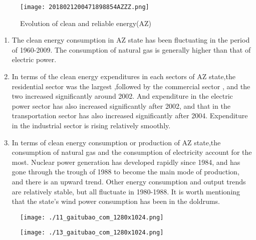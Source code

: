 \documentclass[a4paper]{article}
\begin{document}
\begin{figure}[H]
	\begin{center}
		\texttt{[image: 2018021200471898854AZZZ.png]}
		\caption{Evolution of clean and reliable energy(AZ)}
		\label{Fig:1}
	\end{center}
	\vspace{-0.5em}
\end{figure}

\begin{enumerate}
\item The clean energy consumption in AZ state has been fluctuating in the period of 1960-2009. The consumption of natural gas is generally higher than that of electric power.

\item In terms of the clean energy expenditures in each sectors of AZ state,the residential sector was the largest ,followed by the commercial sector , and the two increased significantly around 2002. And expenditure in the electric power sector has also increased significantly after 2002, and that in the transportation sector has also increased significantly after 2004. Expenditure in the industrial sector is rising relatively smoothly.

\item In terms of clean energy consumption or production of AZ state,the consumption of natural gas and the consumption of electricity account for the most. Nuclear power generation has developed rapidly since 1984, and has gone through the trough of 1988 to become the main mode of production, and there is an upward trend. Other energy consumption and output trends are relatively stable, but all fluctuate in 1980-1988. It is worth mentioning that the state's wind power consumption has been in the doldrums.

\end{enumerate}



\begin{figure}[H]
\begin{minipage}[t]{0.5\linewidth}
\centering
\texttt{[image: ./11\_gaitubao\_com\_1280x1024.png]}
\label{fig:side:a}
\end{minipage}%
\begin{minipage}[t]{0.5\linewidth}
\centering
\texttt{[image: ./13\_gaitubao\_com\_1280x1024.png]}
\label{fig:side:b}
\end{minipage}
\end{figure}
\end{document}
